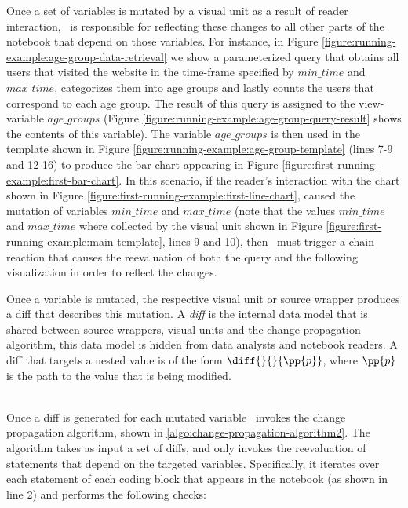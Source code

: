 Once a set of variables is mutated by a visual unit as a result of reader interaction, \projname\ is responsible for reflecting these changes to all other parts of the notebook that depend on those variables. For instance, in Figure \ref{figure:running-example:age-group-data-retrieval} we show a parameterized query that obtains all users that visited the website in the time-frame specified by $min\_time$ and $max\_time$, categorizes them into age groups and lastly counts the users that correspond to each age group. The result of this query is assigned to the view-variable $age\_groups$ (Figure \ref{figure:running-example:age-group-query-result} shows the contents of this variable). The variable $age\_groups$ is then used in the template shown in Figure \ref{figure:running-example:age-group-template} (lines 7-9 and 12-16) to produce the bar chart appearing in Figure \ref{figure:first-running-example:first-bar-chart}. In this scenario, if the reader's interaction with the chart shown in Figure \ref{figure:first-running-example:first-line-chart}, caused the mutation of variables $min\_time$ and $max\_time$ (note that the values $min\_time$ and $max\_time$ where collected by the visual unit shown in Figure \ref{figure:first-running-example:main-template}, lines 9 and 10), then \projname\ must trigger a chain reaction that causes the reevaluation of both the query and the following visualization in order to reflect the changes. 





 Once a variable is mutated, the respective visual unit or source wrapper produces a diff that describes this mutation. A \emph{diff} is the internal data model that is shared between source wrappers, visual units and the change propagation algorithm, this data model is hidden from data analysts and notebook readers. A diff that targets a nested value is of the form $\diff{}{}{\pp{p}}$, where $\pp{p}$ is the path to the value that is being modified. 



\\
Once a diff is generated for each mutated variable \projname\ invokes the change propagation algorithm, shown in \ref{algo:change-propagation-algorithm2}. The algorithm takes as input a set of diffs, and only invokes the reevaluation of statements that depend on the targeted variables. Specifically, it iterates over each statement of each coding block that appears in the notebook (as shown in line 2) and performs the following checks:

